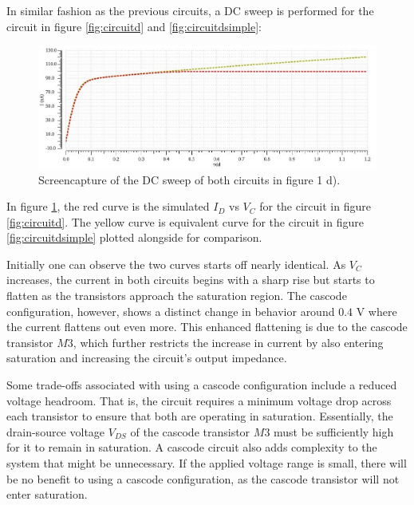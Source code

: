 \documentclass[onecolumn]{article}
\begin{document}
\clearpage

In similar fashion as the previous circuits, a DC sweep is performed for the circuit in figure \ref{fig:circuitd} and \ref{fig:circuitdsimple}:

\begin{figure}[h!]
    \centering
    \includegraphics[width=1\textwidth]{plot_circuit_d_dc_sweep_omskjert.jpg}
    \caption{Screencapture of the DC sweep of both circuits in figure 1 d).}
    \label{fig:plotd}
\end{figure}

In figure \ref{fig:plotd}, the red curve is the simulated $I_D$ vs $V_{C}$ for the circuit in figure \ref{fig:circuitd}. The yellow curve is equivalent curve for the circuit in figure \ref{fig:circuitdsimple} plotted alongside for comparison.  

Initially one can observe the two curves starts off nearly identical. As $V_{C}$ increases, the current in both circuits begins with a sharp rise but starts to flatten as the transistors approach the saturation region. The cascode configuration, however, shows a distinct change in behavior around $0.4$ V where the current flattens out even more. This enhanced flattening is due to the cascode transistor $M3$, which further restricts the increase in current by also entering saturation and increasing the circuit's output impedance.

Some trade-offs associated with using a cascode configuration include a reduced voltage headroom. That is, the circuit requires a minimum voltage drop across each transistor to ensure that both are operating in saturation. Essentially, the drain-source voltage $V_{DS}$ of the cascode transistor $M3$ must be sufficiently high for it to remain in saturation. A cascode circuit also adds complexity to the system that might be unnecessary. If the applied voltage range is small, there will be no benefit to using a cascode configuration, as the cascode transistor will not enter saturation.
\end{document}
